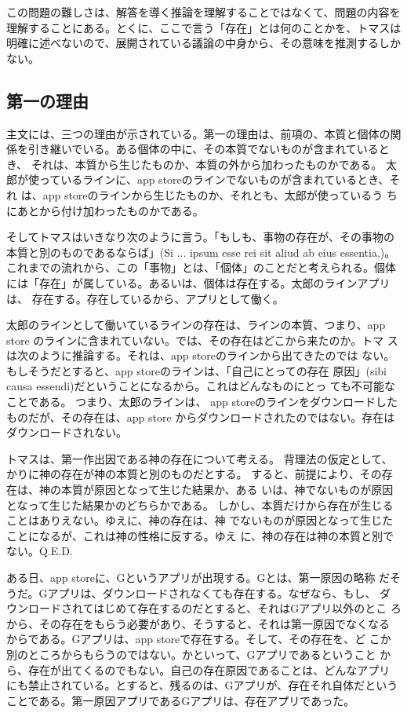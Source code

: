 \documentclass[paper=a4paper,fontsize=10pt,jafontsize=9pt,titlepage]{jlreq}
\begin{document}
この問題の難しさは、解答を導く推論を理解することではなくて、問題の内容を
理解することにある。とくに、ここで言う「存在」とは何のことかを、トマスは
明確に述べないので、展開されている議論の中身から、その意味を推測するしか
ない。

\subsection{第一の理由}
主文には、三つの理由が示されている。第一の理由は、前項の、本質と個体の関
係を引き継いでいる。ある個体の中に、その本質でないものが含まれているとき、
それは、本質から生じたものか、本質の外から加わったものかである。
太郎が使っているラインに、app storeのラインでないものが含まれているとき、それ
は、app storeのラインから生じたものか、それとも、太郎が使っているう
ちにあとから付け加わったものかである。

そしてトマスはいきなり次のように言う。「もしも、事物の存在が、その事物の
本質と別のものであるならば」(Si ... ipsum esse rei sit aliud ab eius
essentia,)。
これまでの流れから、この「事物」とは、「個体」のことだと考えられる。個体
には「存在」が属している。あるいは、個体は存在する。太郎のラインアプリは、
存在する。存在しているから、アプリとして働く。

太郎のラインとして働いているラインの存在は、ラインの本質、つまり、app store
のラインに含まれていない。では、その存在はどこから来たのか。トマ
スは次のように推論する。それは、app storeのラインから出てきたのでは
ない。もしそうだとすると、app storeのラインは、「自己にとっての存在
原因」(sibi causa essendi)だということになるから。これはどんなものにとっ
ても不可能なことである。
つまり、太郎のラインは、
app storeのラインをダウンロードしたものだが、その存在は、app store
からダウンロードされたのではない。存在はダウンロードされない。

トマスは、第一作出因である神の存在について考える。
背理法の仮定として、かりに神の存在が神の本質と別のものだとする。
すると、前提により、その存在は、神の本質が原因となって生じた結果か、ある
いは、神でないものが原因となって生じた結果かのどちらかである。
しかし、本質だけから存在が生じることはありえない。ゆえに、神の存在は、神
でないものが原因となって生じたことになるが、これは神の性格に反する。ゆえ
に、神の存在は神の本質と別でない。Q.E.D.


ある日、app storeに、Gというアプリが出現する。Gとは、第一原因の略称
だそうだ。Gアプリは、ダウンロードされなくても存在する。なぜなら、もし、
ダウンロードされてはじめて存在するのだとすると、それはGアプリ以外のとこ
ろから、その存在をもらう必要があり、そうすると、それは第一原因でなくなる
からである。Gアプリは、app storeで存在する。そして、その存在を、ど
こか別のところからもらうのではない。かといって、Gアプリであるということ
から、存在が出てくるのでもない。自己の存在原因であることは、どんなアプリ
にも禁止されている。とすると、残るのは、Gアプリが、存在それ自体だという
ことである。第一原因アプリであるGアプリは、存在アプリであった。
\end{document}
